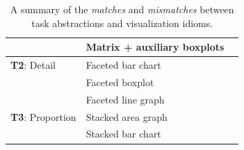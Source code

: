 \documentclass[journal]{vgtc}                %
\newcommand*\match{\textcolor{darkGreen}{\ding{52}}}
\newcommand*\mismatch{\textcolor{red}{\ding{54}}}
\begin{document}
\begin{table}[ht]
\begin{center}
\begin{tabular}{l|l|c}
        \cellcolor{nmYellow} %
        
        & \cellcolor{nmGreen} Matrix + auxiliary boxplots 
        
        & \match
        
        \\
        
        \hline
        
        \cellcolor{nmYellow} {\bf T2}: Detail 
        
        & \cellcolor{nmGreen} Faceted bar chart 
        
        & \match
        
        \\
        
        \cellcolor{nmYellow} %
        
        & \cellcolor{nmGreen} Faceted boxplot 
        
        & \mismatch
        
        \\
        
        \cellcolor{nmYellow} %
        
        & \cellcolor{nmGreen} Faceted line graph 
        
        & \match
        
        \\
        
        \hline
        
        \cellcolor{nmYellow} {\bf T3}: Proportion 
        
        & \cellcolor{nmGreen} Stacked area graph 
        
        & \match
        
        \\
        
        \cellcolor{nmYellow} %
        
        & \cellcolor{nmGreen} Stacked bar chart 
        
        & \match
        
        \\
        
        \hline  
        
    \end{tabular}
    \vspace{-0.3cm}
    \caption{A summary of the \textsl{matches} and \textsl{mismatches} between task abstractions and visualization idioms.}
    \label{tab:matches-mismatches}
    \end{center}
    \vspace{-0.6cm}
\end{table}
\end{document}
